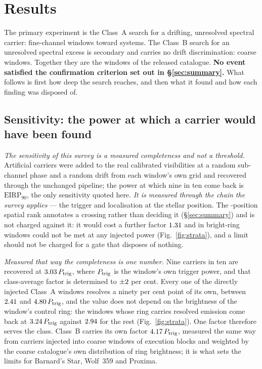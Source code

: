 \section{Results}
\label{sec:results}

The primary experiment is the Class~A search for a drifting, unresolved
spectral carrier: \NWinA{} fine-channel windows toward \NSysClassA{}
systems. The Class~B search for an unresolved spectral excess is secondary
and carries no drift discrimination: \NWinB{} coarse windows. Together they
are the \NWindows{} windows of the released catalogue. \textbf{No event
satisfied the confirmation criterion set out in \S\ref{sec:summary}.} What
follows is first how deep the search reaches, and then what it found and how
each finding was disposed of.

\subsection{Sensitivity: the power at which a carrier would have been
found} \label{sec:pninetysel}

\emph{The sensitivity of this survey is a measured completeness and not a
threshold.} Artificial carriers were added to the real calibrated
visibilities at a random sub-channel phase and a random drift from each
window's own grid and recovered through the unchanged pipeline; the power at
which nine in ten come back is $\mathrm{EIRP}_{90}$, the only sensitivity
quoted here. \emph{It is measured through the chain the survey applies} ---
the trigger and localisation at the stellar position. The \NCtrl-position
spatial rank annotates a crossing rather than deciding it
(\S\ref{sec:summary}) and is not charged against it: it would cost a further
factor $1.31$ and in \SensNRingHiUnres{} bright-ring windows could
not be met at any injected power (Fig.~\ref{fig:strata}), and a limit should
not be charged for a gate that disposes of nothing.

\emph{Measured that way the completeness is one number.} Nine carriers in ten
are recovered at $3.03\,P_{\rm trig}$, where $P_{\rm trig}$ is the
window's own trigger power, and that class-average factor is determined to
$\pm2$ per cent. Every one of the \SensNInj{} directly injected
Class~A windows resolves a ninety per cent point of its own, between
$2.41$ and $4.80\,P_{\rm trig}$, and the value does not
depend on the brightness of the window's control ring: the \SensNRingHi{}
windows whose ring carries resolved emission come back at
$3.24\,P_{\rm trig}$ against $2.94$ for the rest
(Fig.~\ref{fig:strata}). One factor therefore serves the class. Class~B
carries
its own factor $4.17\,P_{\rm trig}$, measured the same way from
\SensNToneCoarse{} carriers injected into \SensNInjCoarse{} coarse windows of
\SensNInjCoarseBlock{} execution blocks and weighted by the coarse
catalogue's own distribution of ring brightness; it is what sets the limits
for Barnard's Star, Wolf~359 and Proxima.

